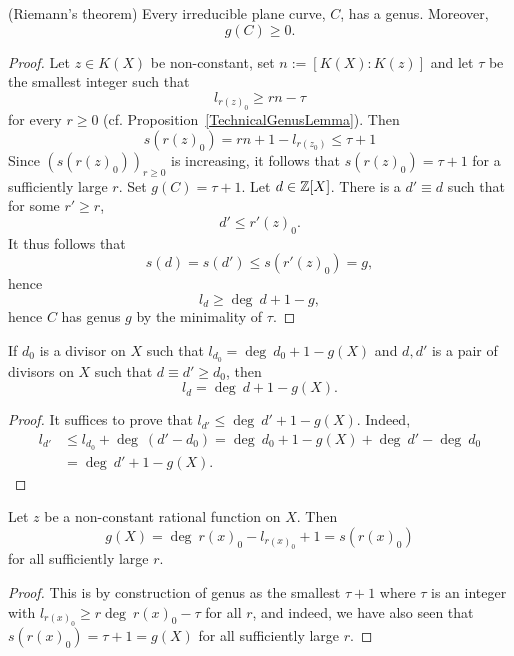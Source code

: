     \begin{theorem} (Riemann's theorem)
        Every irreducible plane curve, $C$, has a genus. Moreover, 
        $$
            g(C)\geq 0.
        $$
    \end{theorem}
    \begin{proof}
        Let $z\in K(X)$ be non-constant, set $n:= [K(X):K(z)]$ and let $\tau$ be the smallest integer such that 
        $$
            l_{r(z)_0} \geq rn-\tau 
        $$
        for every $r\geq 0$ (cf. Proposition~\ref{TechnicalGenusLemma}). Then 
        $$
            s(r(z)_0) = rn +1-l_{r(z_0)}\leq \tau + 1
        $$ 
        Since $(s(r(z)_0))_{r\geq0}$ is increasing, it follows that $s(r(z)_0)=\tau+1$ for a sufficiently large $r$. Set $g(C) = \tau +1$. Let $d\in \mathbb{Z}[X]$. There is a $d'\equiv d$ such that for some $r'\geq r$,
        $$
            d' \leq r'(z)_0.
        $$
        It thus follows that 
        $$
            s(d) = s(d') \leq s(r'(z)_0) = g,
        $$
        hence 
        $$
            l_d \geq \deg \ d + 1 - g,
        $$
        hence $C$ has genus $g$ by the minimality of $\tau$.
    \end{proof}

    \begin{corollary}
        If $d_0$ is a divisor on $X$ such that $l_{d_0} = \deg \ d_0 +1 -g(X)$ and $d,d'$ is a pair of divisors on $X$ such that $d\equiv d' \geq d_0$, then 
        $$
            l_d = \deg \ d + 1 -g(X).
        $$
    \end{corollary}
    \begin{proof}
        It suffices to prove that $l_{d'}\leq \deg \ d' +1 -g(X)$. Indeed,  
        \begin{align*}
            l_{d'}&\leq l_{d_0}+\deg \ (d'-d_0) = \deg \ d_0 + 1 -g(X)+\deg \ d' -\deg \ d_0\\ 
            &= \deg\ d'+1-g(X).
        \end{align*}
    \end{proof}
    
    \begin{corollary}\label{GenusViaNonConstantRationalFunction}
        Let $z$ be a non-constant rational function on $X$. Then 
        $$
            g(X) = \deg \ r(x)_0-l_{r(x)_0}+1 = s(r(x)_0)
        $$
        for all sufficiently large $r$.
    \end{corollary}
    \begin{proof}
        This is by construction of genus as the smallest $\tau+1$ where $\tau$ is an integer with $l_{r(x)_0}\geq r\deg \ r(x)_0-\tau$ for all $r$, and indeed, we have also seen that $s(r(x)_0) = \tau +1 =g(X)$ for all sufficiently large $r$.
    \end{proof}

